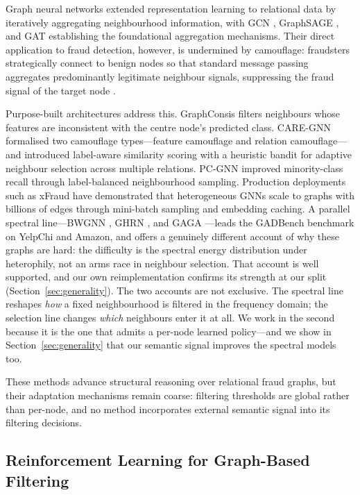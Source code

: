 \documentclass{conf}
\begin{document}
Graph neural networks extended representation learning to relational
data by iteratively aggregating neighbourhood information, with GCN
\cite{kipf2017semi}, GraphSAGE \cite{hamilton2017inductive}, and GAT
\cite{velickovic2018graph} establishing the foundational aggregation
mechanisms. Their direct application to fraud
detection, however, is undermined by camouflage: fraudsters
strategically connect to benign nodes so that standard message
passing aggregates predominantly legitimate neighbour signals,
suppressing the fraud signal of the target node
\cite{liu2020alleviating}.

Purpose-built architectures address this. GraphConsis
\cite{liu2020alleviating} filters neighbours whose features are
inconsistent with the centre node's predicted class. CARE-GNN
\cite{dou2020enhancing} formalised two camouflage types---feature
camouflage and relation camouflage---and introduced label-aware
similarity scoring with a heuristic bandit for adaptive neighbour
selection across multiple relations. PC-GNN \cite{liu2021pick}
improved minority-class recall through label-balanced neighbourhood
sampling. Production deployments such as xFraud \cite{rao2022xfraud}
have demonstrated that heterogeneous GNNs scale to graphs with
billions of edges through mini-batch sampling and embedding caching.
A parallel spectral line---BWGNN \cite{tang2022bwgnn},
GHRN \cite{gao2023ghrn}, and GAGA \cite{wang2023gaga}---leads the GADBench
benchmark \cite{tang2023gadbench} on YelpChi and Amazon, and offers a
genuinely different account of why these graphs are hard: the difficulty is
the spectral energy distribution under heterophily, not an arms race in
neighbour selection. That account is well supported, and our own
reimplementation confirms its strength at our split
(Section~\ref{sec:generality}). The two accounts are not exclusive. The
spectral line reshapes \emph{how} a fixed neighbourhood is filtered in the
frequency domain; the selection line changes \emph{which} neighbours enter it
at all. We work in the second because it is the one that admits a per-node
learned policy---and we show in Section~\ref{sec:generality} that our semantic
signal improves the spectral models too.

These methods advance structural reasoning over relational fraud
graphs, but their adaptation mechanisms remain coarse: filtering
thresholds are global rather than per-node, and no method
incorporates external semantic signal into its filtering decisions.

\subsection{Reinforcement Learning for Graph-Based Filtering}
\end{document}
